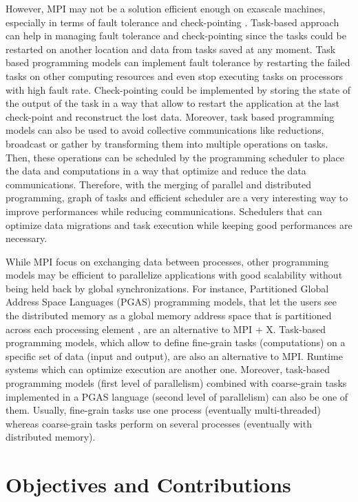 However, MPI may not be a solution efficient enough on exascale machines, especially in terms of fault tolerance and check-pointing \cite{SWAAB2014}.
Task-based approach can help in managing fault tolerance and check-pointing since the tasks could be restarted on another location and data from tasks saved at any moment.
Task based programming models can implement fault tolerance by restarting the failed tasks on other computing resources and even stop executing tasks on processors with high fault rate.
Check-pointing could be implemented by storing the state of the output of the task in a way that allow to restart the application at the last check-point and reconstruct the lost data.
Moreover, task based programming models can also be used to avoid collective communications like reductions, broadcast or gather by transforming them into multiple operations on tasks.
Then, these operations can be scheduled by the programming scheduler to place the data and computations in a way that optimize and reduce the data communications.
Therefore, with the merging of parallel and distributed programming, graph of tasks and efficient scheduler are a very interesting way to improve performances while reducing communications.
Schedulers that can optimize data migrations and task execution while keeping good performances are necessary.

While MPI focus on exchanging data between processes, other programming models may be efficient to parallelize applications with good scalability without being held back by global synchronizations.
For instance, Partitioned Global Address Space Languages (PGAS) programming models, that let the users see the distributed memory as a global memory address space that is partitioned across each processing element \cite{CDMCE2005}, are an alternative to MPI + X.
Task-based programming models, which allow to define fine-grain tasks (computations) on a specific set of data (input and output), are also an alternative to MPI.
Runtime systems which can optimize execution are another one.
Moreover, task-based programming models (first level of parallelism) combined with coarse-grain tasks implemented in a PGAS language (second level of parallelism) can also be one of them.
Usually, fine-grain tasks use one process (eventually multi-threaded) whereas coarse-grain tasks perform on several processes (eventually with distributed memory).

\section{Objectives and Contributions}

